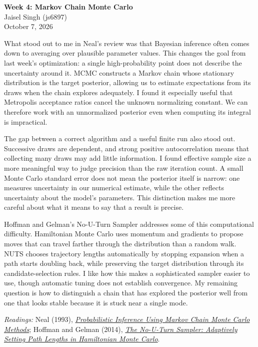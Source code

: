 \documentclass[12pt]{article}
\begin{document}
\begin{flushleft}
\textbf{Week 4: Markov Chain Monte Carlo} \\
Jaisel Singh (js6897) \\
October 7, 2026
\end{flushleft}

\vspace{0.1in}

What stood out to me in Neal's review was that Bayesian inference often comes
down to averaging over plausible parameter values. This changes the goal from
last week's optimization: a single high-probability point does not describe the
uncertainty around it. MCMC constructs a Markov chain whose stationary
distribution is the target posterior, allowing us to estimate expectations from
its draws when the chain explores adequately. I found it especially useful that
Metropolis acceptance ratios cancel the unknown normalizing constant. We can
therefore work with an unnormalized posterior even when computing its integral
is impractical.

The gap between a correct algorithm and a useful finite run also stood out.
Successive draws are dependent, and strong positive autocorrelation means that
collecting many draws may add little information. I found effective sample size
a more meaningful way to judge precision than the raw iteration count. A small
Monte Carlo standard error does not mean the posterior itself is narrow:
one measures uncertainty in our numerical estimate, while the other reflects
uncertainty about the model's parameters. This distinction makes me more careful
about what it means to say that a result is precise.

Hoffman and Gelman's No-U-Turn Sampler addresses some of this computational
difficulty. Hamiltonian Monte Carlo uses momentum and gradients to propose
moves that can travel farther through the distribution than a random walk.
NUTS chooses trajectory lengths automatically by stopping expansion when a path
starts doubling back, while preserving the target distribution through its
candidate-selection rules. I like how this makes a sophisticated sampler easier
to use, though automatic tuning does not establish convergence. My remaining
question is how to distinguish a chain that has explored the posterior well
from one that looks stable because it is stuck near a single mode.

\vspace{0.05in}
{\footnotesize
\textit{Readings:} Neal (1993), \href{https://ftp.cs.toronto.edu/pub/radford/review.pdf}{\emph{Probabilistic Inference Using Markov Chain Monte Carlo Methods}};
Hoffman and Gelman (2014), \href{https://jmlr.org/papers/v15/hoffman14a.html}{\emph{The No-U-Turn Sampler: Adaptively Setting Path Lengths in Hamiltonian Monte Carlo}}.
\par}
\end{document}
